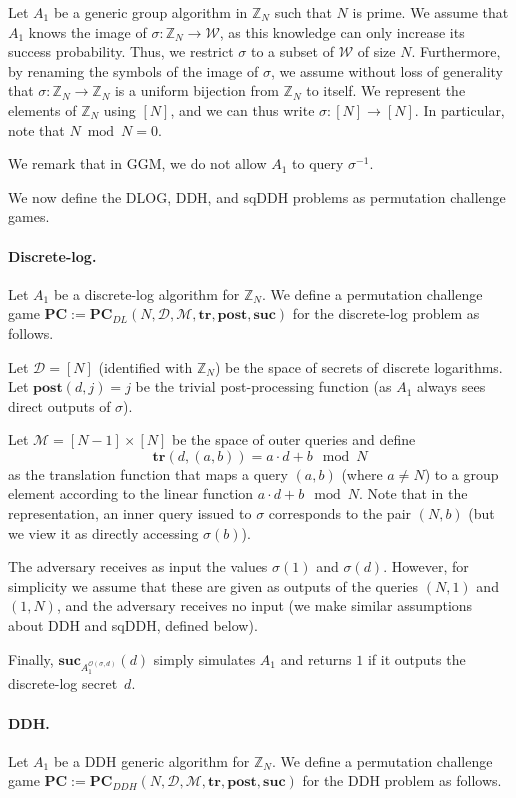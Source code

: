 \documentclass[11pt]{article}
\newcommand{\SECS}{{\mathcal{D}}}
\newcommand{\SUC}{\boldsymbol{suc}}
\newcommand{\TR}{\boldsymbol{tr}}
\newcommand{\POST}{\boldsymbol{post}}
\newcommand{\PC}{\boldsymbol{PC}}
\begin{document}
Let $A_1$ be a generic group algorithm in $\mathbb{Z}_N$ such that $N$ is prime. 
We assume that $A_1$ knows the image of $\sigma:\mathbb{Z}_N \rightarrow \mathcal{W}$, as this knowledge can only increase its success probability. Thus, we restrict $\sigma$ to a subset of $\mathcal{W}$ of size $N$.
Furthermore, by renaming the symbols of the image of $\sigma$, we assume without loss of generality that 
$\sigma:\mathbb{Z}_N \rightarrow \mathbb{Z}_N$ is a uniform bijection from $\mathbb{Z}_N$ to itself.
We represent the elements of $\mathbb{Z}_N$ using $[N]$, and we can thus write $\sigma:[N] \rightarrow [N]$. In particular, note that $N \bmod N = 0$.

We remark that in GGM, we do not allow $A_1$ to query $\sigma^{-1}$.

We now define the DLOG, DDH, and sqDDH problems as permutation challenge games.
\paragraph{Discrete-log.} Let $A_1$ be a discrete-log algorithm for $\mathbb{Z}_N$.
We define a permutation challenge game
$\PC := \PC_{DL}(N,\SECS,\mathcal{M},\TR,\POST,\SUC)$ for the discrete-log problem as follows.

Let $\SECS = [N]$ (identified with $\mathbb{Z}_N$) be the space of secrets of discrete logarithms.
Let $\POST(d,j) = j$ be the trivial post-processing function (as $A_1$ always sees direct outputs of $\sigma$).

Let $\mathcal{M} = [N-1] \times [N]$ be the space of outer queries
and define 
$$\TR(d,(a,b)) = a \cdot d + b \mod N$$ as the translation function that maps a query $(a,b)$
(where $a \neq N$) to a group element according to the linear function $a \cdot d + b \mod N$.
Note that in the representation, an inner query issued to $\sigma$ corresponds to the pair $(N,b)$
(but we view it as directly accessing $\sigma(b)$).

The adversary receives as input the values $\sigma(1)$ and $\sigma(d)$.
However, for simplicity we assume that these are given as outputs of the queries 
$(N,1)$ and $(1,N)$, and the adversary receives no input 
(we make similar assumptions about DDH and sqDDH, defined below). 

Finally, 
$\SUC_{A_1^{\mathcal{O}(\sigma,d)}}(d)$
simply simulates $A_1$ and returns $1$ if it outputs the discrete-log secret~$d$.

\paragraph{DDH.}
Let $A_1$ be a DDH generic algorithm for $\mathbb{Z}_N$.
We define a permutation challenge game
$\PC := \PC_{DDH}(N,\SECS,\mathcal{M},\TR,\POST,\SUC)$ for the DDH problem as follows.
\end{document}
